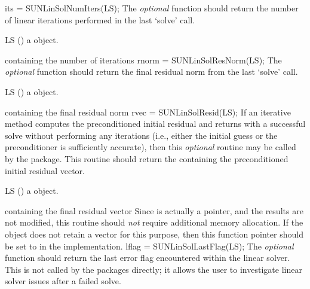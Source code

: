 {
  its = SUNLinSolNumIters(LS);
}
{
  The \emph{optional} function 
  should return the number of linear iterations performed in
  the last `solve' call.
}
{
  \begin{args}[LS]
  \item[LS] ()
    a {\sunlinsol} object.
  \end{args}
}
{
   containing the number of iterations
}
{}
{
  rnorm = SUNLinSolResNorm(LS);
}
{
  The \emph{optional} function 
  should return the final residual norm from the last
  `solve' call.
}
{
  \begin{args}[LS]
  \item[LS] ()
    a {\sunlinsol} object.
  \end{args}
}
{
   containing the final residual norm
}
{}
{
  rvec = SUNLinSolResid(LS);
}
{
   If an iterative method computes the preconditioned initial residual
   and returns with a successful solve without performing any
   iterations (i.e., either the initial guess or the preconditioner is
   sufficiently accurate), then this \emph{optional} routine may be
   called by the {\sundials} package.  This routine should return the
   {\nvector} containing the preconditioned initial residual vector.
}
{
  \begin{args}[LS]
  \item[LS] ()
    a {\sunlinsol} object.
  \end{args}
}
{
   containing the final residual vector
}
{
  Since  is actually a pointer, and the results
  are not modified, this routine should \emph{not} require additional
  memory allocation.  If the {\sunlinsol} object does not retain a
  vector for this purpose, then this function pointer should be set to
   in the implementation.
}
{
  lflag = SUNLinSolLastFlag(LS);
}
{
  The \emph{optional} function 
  should return the last error flag encountered within the
  linear solver. This is not called by the {\sundials} packages
  directly; it allows the user to investigate linear solver issues
  after a failed solve.
}
